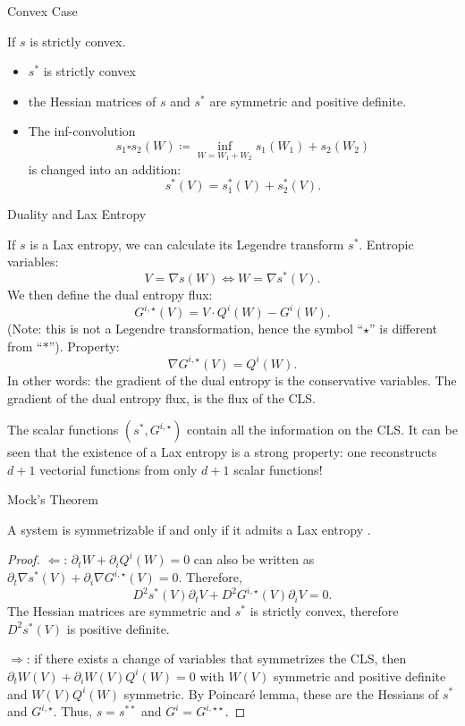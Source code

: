 \documentclass[english]{beamer}
\begin{document}
 \begin{frame}{Convex Case}

If $s$ is strictly convex.
\begin{itemize}
\item $s^{*}$ is strictly convex
\item the Hessian matrices of $s$ and $s^{*}$ are symmetric and positive definite.
\item The inf-convolution
$$
s_{1}\square s_{2}(W)\coloneqq \inf_{W=W_{1}+W_{2}}s_{1}(W_{1})+s_{2}(W_{2})
$$
is changed into an addition:
$$
s^{*}(V)=s_{1}^{*}(V)+s_{2}^{*}(V).
$$
\end{itemize}
\end{frame}
%
\begin{frame}{Duality and Lax Entropy}

If $s$ is a Lax entropy, we can calculate its Legendre transform $s^{*}$. Entropic variables:
\[
V=\nabla s(W)\Leftrightarrow W=\nabla s^{*}(V).
\]
We then define the dual entropy flux:
\[
G^{i,\star}(V)=V\cdot Q^{i}(W)-G^{i}(W).
\]
(Note: this is not a Legendre transformation, hence the symbol
``$\star$'' is different from ``$\ast$''). Property:
\[
\nabla G^{i,\star}(V)=Q^{i}(W).
\]
In other words: the gradient of the dual entropy is the conservative variables. The gradient of the dual entropy flux, is the flux of the CLS.

The scalar functions $(s^{*},G^{i,\star})$ contain all the information on the CLS. It can be seen that the existence of a Lax entropy is a strong property: one reconstructs $d+1$ vectorial functions from only $d+1$ scalar functions!
\end{frame}
%
\begin{frame}{Mock's Theorem}
\begin{theorem}
A system is symmetrizable if and only if it admits a Lax entropy \cite{mock80,mazet89,harten98}.
\end{theorem}

\begin{proof}
$\Leftarrow$: $\partial_{t}W+\partial_{i}Q^{i}(W)=0$ can also be written as $\partial_{t}\nabla s^{*}(V)+\partial_{i}\nabla G^{i,\star}(V)=0.$ Therefore,
\[
D^{2}s^{*}(V)\partial_{t}V+D^{2}G^{i,\star}(V)\partial_{i}V=0.
\]
The Hessian matrices are symmetric and $s^{*}$ is strictly convex, therefore $D^{2}s^{*}(V)$ is positive definite.

$\Rightarrow$: if there exists a change of variables that symmetrizes the CLS, then $\partial_{t}W(V)+\partial_{i}W(V)Q^{i}(W)=0$ with $W(V)$ symmetric and positive definite and $W(V)Q^{i}(W)$ symmetric. By Poincaré lemma, these are the Hessians of $s^{*}$ and $G^{i,\star}.$ Thus, $s=s^{**}$ and $G^{i}=G^{i,\star\star}$. 
\end{proof}

\end{frame}
\end{document}
